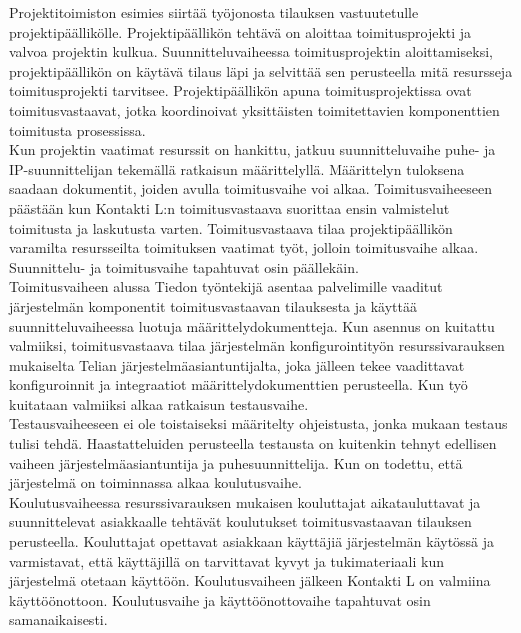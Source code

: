 \documentclass[finnish,12pt,a4paper,pdftex]{article}
\begin{document}
Projektitoimiston esimies siirtää työjonosta tilauksen vastuutetulle projektipäällikölle. Projektipäällikön tehtävä on aloittaa toimitusprojekti ja valvoa projektin kulkua. Suunnitteluvaiheessa toimitusprojektin aloittamiseksi, projektipäällikön on käytävä tilaus läpi ja selvittää sen perusteella mitä resursseja toimitusprojekti tarvitsee. Projektipäällikön apuna toimitusprojektissa ovat toimitusvastaavat, jotka koordinoivat yksittäisten toimitettavien komponenttien toimitusta prosessissa.\\

Kun projektin vaatimat resurssit on hankittu, jatkuu suunnitteluvaihe puhe- ja IP-suunnittelijan tekemällä ratkaisun määrittelyllä. Määrittelyn tuloksena saadaan dokumentit, joiden avulla toimitusvaihe voi alkaa. Toimitusvaiheeseen päästään kun Kontakti L:n toimitusvastaava suorittaa ensin valmistelut toimitusta ja laskutusta varten. Toimitusvastaava tilaa projektipäällikön varamilta resursseilta toimituksen vaatimat työt, jolloin toimitusvaihe alkaa. Suunnittelu- ja toimitusvaihe tapahtuvat osin päällekäin.\\

Toimitusvaiheen alussa Tiedon työntekijä asentaa palvelimille vaaditut järjestelmän komponentit toimitusvastaavan tilauksesta ja käyttää suunnitteluvaiheessa luotuja määrittelydokumentteja. Kun asennus on kuitattu valmiiksi, toimitusvastaava tilaa järjestelmän konfigurointityön resurssivarauksen mukaiselta Telian järjestelmäasiantuntijalta, joka jälleen tekee vaadittavat konfiguroinnit ja integraatiot määrittelydokumenttien perusteella. Kun työ kuitataan valmiiksi alkaa ratkaisun testausvaihe.\\

Testausvaiheeseen ei ole toistaiseksi määritelty ohjeistusta, jonka mukaan testaus tulisi tehdä. Haastatteluiden perusteella testausta on kuitenkin tehnyt edellisen vaiheen järjestelmäasiantuntija ja puhesuunnittelija. Kun on todettu, että järjestelmä on toiminnassa alkaa koulutusvaihe.\\

Koulutusvaiheessa resurssivarauksen mukaisen kouluttajat aikatauluttavat ja suunnittelevat asiakkaalle tehtävät koulutukset toimitusvastaavan tilauksen perusteella. Kouluttajat opettavat asiakkaan käyttäjiä järjestelmän käytössä ja varmistavat, että käyttäjillä on tarvittavat kyvyt ja tukimateriaali kun järjestelmä otetaan käyttöön. Koulutusvaiheen jälkeen Kontakti L on valmiina käyttöönottoon. Koulutusvaihe ja käyttöönottovaihe tapahtuvat osin samanaikaisesti.\\
\end{document}
